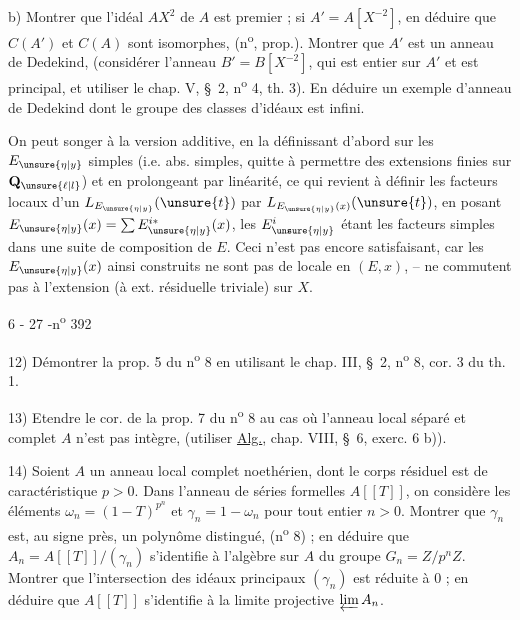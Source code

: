 b) Montrer que l'idéal $AX^2$ de $A$ est premier ; si $A'=A[X^{-2}]$, en déduire que $C(A')$ et $C(A)$ sont isomorphes, (n\textsuperscript{o}\quad, prop.\quad). Montrer que $A'$ est un anneau de Dedekind, (considérer l'anneau $B'=B[X^{-2}]$, qui est entier sur $A'$ et est principal, et utiliser le chap. V, \S\ 2, n\textsuperscript{o} 4, th. 3). En déduire un exemple d'anneau de Dedekind dont le groupe des classes d'idéaux est infini.


On peut songer à la version additive, en la définissant d'abord sur les $E_{\unsure{\eta|y}}$ simples (i.e. abs. simples, quitte à permettre des extensions finies sur $\mathbf{Q}_{\unsure{\ell|l}}$) et en prolongeant par linéarité, ce qui revient à définir les facteurs locaux d'un $L_{E_{\unsure{\eta|y}}}(\unsure{t})$ par $L_{E_{\unsure{\eta|y}}(x)}(\unsure{t})$, en posant $E_{\unsure{\eta|y}}(x)=\sum E_{\unsure{\eta|y}}^{i*}(x)$, les $E_{\unsure{\eta|y}}^i$ étant les facteurs simples dans une suite de composition de $E$. Ceci n'est pas encore satisfaisant, car les $E_{\unsure{\eta|y}}(x)$ ainsi construits ne sont pas de  locale en $(E,x)$, --  ne commutent pas à l'extension   (à ext. résiduelle   triviale) sur $X$.


\begin{center}6 - 27 -\hfill n\textsuperscript{o} 392\end{center}

12) Démontrer la prop. 5 du n\textsuperscript{o} 8 en utilisant le chap. III, \S\ 2, n\textsuperscript{o} 8, cor. 3 du th. 1.

13) Etendre le cor. de la prop. 7 du n\textsuperscript{o} 8 au cas où l'anneau local séparé et complet $A$ n'est pas intègre, (utiliser \uline{Alg.}, chap. VIII, \S\ 6, exerc. 6 b)).

14) Soient $A$ un anneau local complet noethérien, dont le corps résiduel est de caractéristique $p>0$. Dans l'anneau de séries formelles $A[[T]]$, on considère les éléments $\omega_n=(1-T)^{p^n}$ et $\gamma_n=1-\omega_n$ pour tout entier $n>0$. Montrer que $\gamma_n$ est, au signe près, un polynôme distingué, (n\textsuperscript{o} 8) ; en déduire que $A_n=A[[T]]/(\gamma_n)$ s'identifie à l'algèbre sur $A$ du groupe $G_n=Z/p^nZ$. Montrer que l'intersection des idéaux principaux $(\gamma_n)$ est réduite à $0$ ; en déduire que $A[[T]]$ s'identifie à la limite projective $\varprojlim A_n$.

